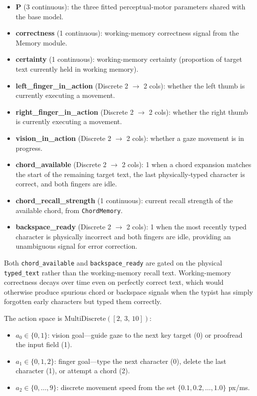 \documentclass[sigconf,review,anonymous]{acmart}
\begin{document}
\begin{itemize}
  \item \textbf{P} (3 continuous): the three fitted perceptual-motor
    parameters shared with the base model. %
  \item \textbf{correctness} (1 continuous): working-memory correctness
    signal from the Memory module.
  \item \textbf{certainty} (1 continuous): working-memory certainty
    (proportion of target text currently held in working memory).
  \item \textbf{left\_finger\_in\_action} (Discrete 2 $\to$ 2 cols):
    whether the left thumb is currently executing a movement.
  \item \textbf{right\_finger\_in\_action} (Discrete 2 $\to$ 2 cols):
    whether the right thumb is currently executing a movement.
  \item \textbf{vision\_in\_action} (Discrete 2 $\to$ 2 cols): whether a
    gaze movement is in progress.
  \item \textbf{chord\_available} (Discrete 2 $\to$ 2 cols): 1 when a chord
    expansion matches the start of the remaining target text, the last
    physically-typed character is correct, and both fingers are idle.
  \item \textbf{chord\_recall\_strength} (1 continuous): current recall
    strength of the available chord, from \texttt{ChordMemory}.
  \item \textbf{backspace\_ready} (Discrete 2 $\to$ 2 cols): 1 when the
    most recently typed character is physically incorrect and both fingers
    are idle, providing an unambiguous signal for error correction.
\end{itemize}

Both \texttt{chord\_available} and \texttt{backspace\_ready} are gated on
the physical \texttt{typed\_text} rather than the working-memory recall
text.  Working-memory correctness decays over time even on perfectly correct
text, which would otherwise produce spurious chord or backspace signals when
the typist has simply forgotten early characters but typed them correctly.

The action space is $\text{MultiDiscrete}([2,\,3,\,10])$:
\begin{itemize}
  \item $a_0 \in \{0,1\}$: vision goal—guide gaze to the next key target (0)
    or proofread the input field (1).
  \item $a_1 \in \{0,1,2\}$: finger goal—type the next character (0),
    delete the last character (1), or attempt a chord (2).
  \item $a_2 \in \{0,\ldots,9\}$: discrete movement speed from the set
    $\{0.1, 0.2, \ldots, 1.0\}$ px/ms.
\end{itemize}
\end{document}
